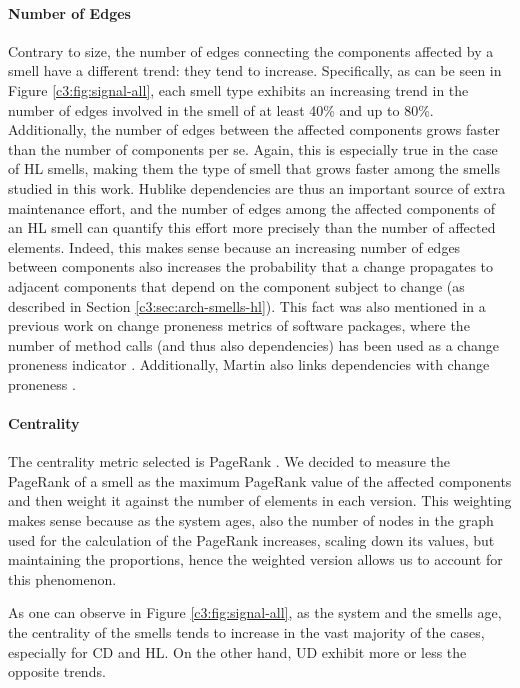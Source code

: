 \paragraph{Number of Edges}
Contrary to size, the number of edges connecting the components affected by a smell have a different trend: they tend to increase.
Specifically, as can be seen in Figure \ref{c3:fig:signal-all}, each smell type exhibits an increasing trend in the number of edges involved in the smell of at least 40\% and up to 80\%.
Additionally, the number of edges between the affected components grows faster than the number of components per se.
Again, this is especially true in the case of HL smells, making them the type of smell that grows faster among the smells studied in this work.
Hublike dependencies are thus an important source of extra maintenance effort, and the number of edges among the affected components of an HL smell can quantify this effort more precisely than the number of affected elements. 
Indeed, this makes sense because an increasing number of edges between components also increases the probability that a change propagates to adjacent components that depend on the component subject to change (as described in Section \ref{c3:sec:arch-smells-hl}).
This fact was also mentioned in a previous work on change proneness metrics of software packages, where the number of method calls (and thus also dependencies) has been used as a change proneness indicator \cite{Arvanitou2015}. Additionally, Martin also links dependencies with change proneness \cite{Martin2018}.

\paragraph{Centrality} 
The centrality metric selected is PageRank \cite{Roveda2018}. We decided to measure the PageRank of a smell as the maximum PageRank value of the affected components and then weight it against the number of elements in each version.
This weighting makes sense because as the system ages, also the number of nodes in the graph used for the calculation of the PageRank increases, scaling down its values, but maintaining the proportions, hence the weighted version allows us to account for this phenomenon.

As one can observe in Figure \ref{c3:fig:signal-all}, as the system and the smells age, the centrality of the smells tends to increase in the vast majority of the cases, especially for CD and HL. On the other hand, UD exhibit more or less the opposite trends.

